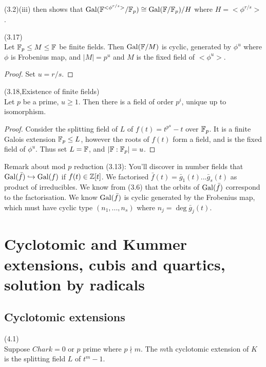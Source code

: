 \documentclass[a4paper]{article}
\begin{document}
(3.2)(iii) then shows that $\operatorname{Gal}(\mathbb{F}^{<\phi^{r/s}>}/\mathbb{F}_p) \cong \operatorname{Gal}(\mathbb{F}/\mathbb{F}_p) / H$ where $H = <\phi^{r/s}>$.

\begin{coro} (3.17)\\
Let $\mathbb{F}_p \leq M \leq \mathbb{F}$ be finite fields. Then $\operatorname{Gal}(\mathbb{F}/M)$ is cyclic, generated by $\phi^u$ where $\phi$ is Frobenius map, and $|M| = p^u$ and $M$ is the fixed field of $<\phi^u>$.
\begin{proof}
Set $u=r/s$.
\end{proof}
\end{coro}

\begin{thm} (3.18,Existence of finite fields)\\
Let $p$ be a prime, $u \geq 1$. Then there is a field of order $p^i$, unique up to isomorphism.
\begin{proof}
Consider the splitting field of $L$ of $f(t) = t^{p^u}-t$ over $\mathbb{F}_p$. It is a finite Galois extension $\mathbb{F}_p \leq L$, however the roots of $f(t)$ form a field, and is the fixed field of $\phi^u$. Thus set $L=\mathbb{F}$, and $|\mathbb{F}:\mathbb{F}_p| = u$.
\end{proof}
\end{thm}

Remark about mod $p$ reduction (3.13): You'll discover in number fields that $\operatorname{Gal}(\bar{f}) \hookrightarrow \operatorname{Gal}(f)$ if $f(t) \in \mathbb{Z}[t]$. We factorised $\bar{f}(t) = \bar{g}_1(t)...\bar{g}_s(t)$ as product of irreducibles. We know from (3.6) that the orbits of $\operatorname{Gal}(\bar{f})$ correspond to the factorisation. We know $\operatorname{Gal}(\bar{f})$ is cyclic generated by the Frobenius map, which must have cyclic type $(n_1,...,n_s)$ where $n_j = \deg \bar{g}_j(t)$.

\newpage

\section{Cyclotomic and Kummer extensions, cubis and quartics, solution by radicals}
\subsection{Cyclotomic extensions}
\begin{defi} (4.1)\\
Suppose $Char k = 0$ or $p$ prime where $p \nmid m$. The $m$th cyclotomic extension of $K$ is the splitting field $L$ of $t^m-1$.
\end{defi}
\end{document}
